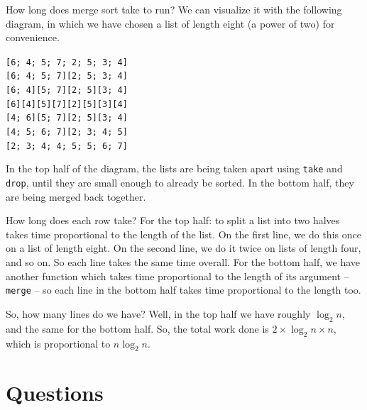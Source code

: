 \documentclass[]{book}
\newcommand{\smspace}{\vspace{4mm}}
\begin{document}
How long does merge sort take to run? We can visualize it with the following diagram, in which we have chosen a list of length eight (a power of two) for convenience.

\smspace
  \noindent\texttt{[6; 4; 5; 7; 2; 5; 3; 4]}\\
  \texttt{[6; 4; 5; 7][2; 5; 3; 4]}\\
  \texttt{[6; 4][5; 7][2; 5][3; 4]}\\
  \texttt{[6][4][5][7][2][5][3][4]}\\
  \texttt{[4; 6][5; 7][2; 5][3; 4]}\\
  \texttt{[4; 5; 6; 7][2; 3; 4; 5]}\\
  \texttt{[2; 3; 4; 4; 5; 5; 6; 7]}
\smspace

\noindent In the top half of the diagram, the lists are being taken apart using \texttt{take} and \texttt{drop}, until they are small enough to already be sorted. In the bottom half, they are being merged back together.

How long does each row take? For the top half: to split a list into two halves takes time proportional to the length of the list. On the first line, we do this once on a list of length eight. On the second line, we do it twice on lists of length four, and so on. So each line takes the same time overall. For the bottom half, we have another function  which takes time proportional to the length of its argument -- \texttt{merge} -- so each line in the bottom half takes time proportional to the length too.

So, how many lines do we have? Well, in the top half we have roughly $\log_{2}n$, and the same for the bottom half. So, the total work done is $2 \times \log_2{n} \times n$, which is proportional to $n \log_{2}n$.

\clearpage
\section*{Questions}
\end{document}
